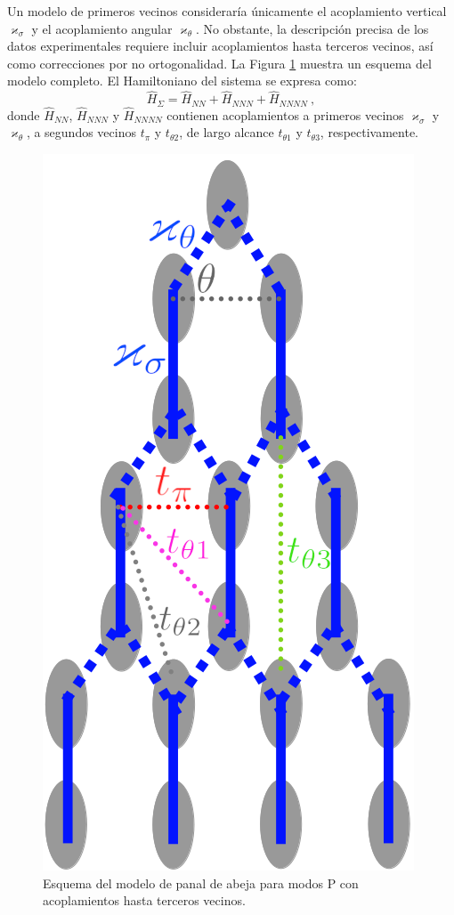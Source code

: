 Un modelo de primeros vecinos consideraría únicamente el acoplamiento vertical $\varkappa_\sigma$ y el acoplamiento angular $\varkappa_\theta$. No obstante, la descripción precisa de los datos experimentales requiere incluir acoplamientos hasta terceros vecinos, así como correcciones por no ortogonalidad. La Figura \ref{fig:honeycombmodel} muestra un esquema del modelo completo. El Hamiltoniano del sistema se expresa como:
\begin{equation}
\hat{H}_\Sigma = \hat{H}_{NN} + \hat{H}_{NNN} + \hat{H}_{NNNN} \ ,
\end{equation}
donde $\hat{H}_{NN}$, $\hat{H}_{NNN}$ y $\hat{H}_{NNNN}$ contienen acoplamientos a primeros vecinos $\varkappa_\sigma$ y $\varkappa_\theta$, a segundos vecinos $t_\pi$ y $t_{\theta 2}$, de largo alcance $t_{\theta 1}$ y $t_{\theta 3}$, respectivamente.

{
	\begin{figure}
		\centering
		\includegraphics[width=0.25\linewidth]{media/honeycomb-lattice.png}
		\caption{Esquema del modelo de panal de abeja para modos P con acoplamientos hasta terceros vecinos. \label{fig:honeycombmodel}}
	\end{figure}
}